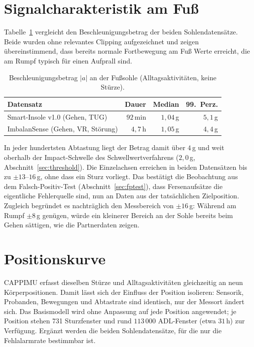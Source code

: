 \documentclass[11pt,a4paper,oneside]{report}
\begin{document}
\section{Signalcharakteristik am Fuß}
\label{sec:fuss_signal}

Tabelle~\ref{tab:fuss_signal} vergleicht den Beschleunigungsbetrag
der beiden Sohlendatensätze. Beide wurden ohne relevantes Clipping
aufgezeichnet und zeigen übereinstimmend, dass bereits normale
Fortbewegung am Fuß Werte erreicht, die am Rumpf typisch für einen
Aufprall sind.

\begin{table}[H]
\centering
\caption{Beschleunigungsbetrag $|a|$ an der Fußsohle (Alltagsaktivitäten,
         keine Stürze).}
\label{tab:fuss_signal}
\small
\begin{tabularx}{0.95\textwidth}{X r r r}
\toprule
\textbf{Datensatz} & \textbf{Dauer} & \textbf{Median} & \textbf{99.~Perz.} \\
\midrule
Smart-Insole v1.0 (Gehen, TUG) & $92$\,min & $1{,}04$\,g & $5{,}1$\,g \\
ImbalanSense (Gehen, VR, Störung) & $4{,}7$\,h & $1{,}05$\,g & $4{,}4$\,g \\
\bottomrule
\end{tabularx}
\end{table}

In jeder hundertsten Abtastung liegt der Betrag damit über $4$\,g und
weit oberhalb der Impact-Schwelle des Schwellwertverfahrens
($2{,}0$\,g, Abschnitt~\ref{sec:threshold}). Die Einzelachsen erreichen in beiden
Datensätzen bis zu $\pm 13$--$16$\,g, ohne dass ein Sturz vorliegt.
Das bestätigt die Beobachtung aus dem Falsch-Positiv-Test
(Abschnitt~\ref{sec:fptest}), dass Fersenaufsätze die eigentliche
Fehlerquelle sind, nun an Daten aus der tatsächlichen Zielposition.
Zugleich begründet es nachträglich den Messbereich von $\pm 16$\,g:
Während am Rumpf $\pm 8$\,g genügen, würde ein kleinerer Bereich an der
Sohle bereits beim Gehen sättigen, wie die Partnerdaten zeigen.

\section{Positionskurve}
\label{sec:fuss_kurve}

CAPPIMU erfasst dieselben Stürze und Alltagsaktivitäten gleichzeitig an
neun Körperpositionen. Damit lässt sich der Einfluss der Position
isolieren: Sensorik, Probanden, Bewegungen und Abtastrate sind
identisch, nur der Messort ändert sich. Das Basismodell wird ohne
Anpassung auf jede Position angewendet; je Position stehen 731
Sturzfenster und rund $113\,000$ ADL-Fenster (etwa $31$\,h) zur
Verfügung. Ergänzt werden die beiden Sohlendatensätze, für die nur die
Fehlalarmrate bestimmbar ist.
\end{document}
